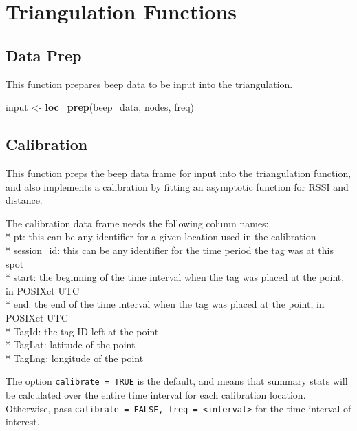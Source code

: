 \documentclass[
]{book}
\newenvironment{Shaded}{\begin{snugshade}}{\end{snugshade}}
\newcommand{\KeywordTok}[1]{\textcolor[rgb]{0.13,0.29,0.53}{\textbf{#1}}}
\newcommand{\NormalTok}[1]{#1}
\newcommand{\StringTok}[1]{\textcolor[rgb]{0.31,0.60,0.02}{#1}}
\begin{document}
\hypertarget{triangulation-functions}{%
\section{Triangulation Functions}\label{triangulation-functions}}

\hypertarget{data-prep}{%
\subsection{Data Prep}\label{data-prep}}

This function prepares beep data to be input into the triangulation.

\begin{Shaded}
\begin{Highlighting}[]
\NormalTok{input <-}\StringTok{ }\KeywordTok{loc_prep}\NormalTok{(beep_data, nodes, freq)  }
\end{Highlighting}
\end{Shaded}

\hypertarget{calibration}{%
\subsection{Calibration}\label{calibration}}

This function preps the beep data frame for input into the triangulation function, and also implements a calibration by fitting an asymptotic function for RSSI and distance.

The calibration data frame needs the following column names:\\
* pt: this can be any identifier for a given location used in the calibration\\
* session\_id: this can be any identifier for the time period the tag was at this spot\\
* start: the beginning of the time interval when the tag was placed at the point, in POSIXct UTC\\
* end: the end of the time interval when the tag was placed at the point, in POSIXct UTC\\
* TagId: the tag ID left at the point\\
* TagLat: latitude of the point\\
* TagLng: longitude of the point

The option \texttt{calibrate\ =\ TRUE} is the default, and means that summary stats will be calculated over the entire time interval for each calibration location. Otherwise, pass \texttt{calibrate\ =\ FALSE,\ freq\ =\ \textless{}interval\textgreater{}} for the time interval of interest.
\end{document}
